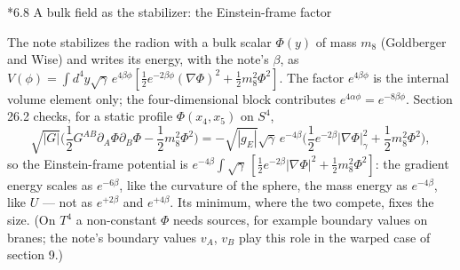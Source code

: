 \documentclass[10pt,a4paper]{article}
\makeatletter
\renewcommand\subsection{\@startsection{subsection}{2}{\z@}{-3.25ex\@plus -1ex \@minus -.2ex}{1.5ex \@plus .2ex}{\normalfont\large\bfseries\raggedright}}
\makeatother
\begin{document}
\subsection*{6.8 A bulk field as the stabilizer: the Einstein-frame factor}
The note stabilizes the radion with a bulk scalar $\Phi(y)$ of mass $m_8$ (Goldberger and Wise) and writes its energy, with the note’s $\beta$, as $V(\phi)=\int d^4y\sqrt\gamma\,e^{4\beta\phi}[\frac12e^{-2\beta\phi}(\nabla\Phi)^2+\frac12m_8^2\Phi^2]$. The factor $e^{4\beta\phi}$ is the internal volume element only; the four-dimensional block contributes $e^{4\alpha\phi}=e^{-8\beta\phi}$. Section 26.2 checks, for a static profile $\Phi(x_4,x_5)$ on $S^4$,
\begin{equation*}
\sqrt{|G|}\Big(\frac12G^{AB}\partial_A\Phi\partial_B\Phi-\frac12m_8^2\Phi^2\Big)=-\sqrt{|g_E|}\sqrt\gamma\,e^{-4\beta}\Big(\frac12e^{-2\beta}|\nabla\Phi|^2_\gamma+\frac12m_8^2\Phi^2\Big),
\end{equation*}
so the Einstein-frame potential is $e^{-4\beta}\int\sqrt\gamma\,[\frac12e^{-2\beta}|\nabla\Phi|^2+\frac12m_8^2\Phi^2]$: the gradient energy scales as $e^{-6\beta}$, like the curvature of the sphere, the mass energy as $e^{-4\beta}$, like $U$ — not as $e^{+2\beta}$ and $e^{+4\beta}$. Its minimum, where the two compete, fixes the size. (On $T^4$ a non-constant $\Phi$ needs sources, for example boundary values on branes; the note’s boundary values $v_A$, $v_B$ play this role in the warped case of section 9.)
\end{document}
